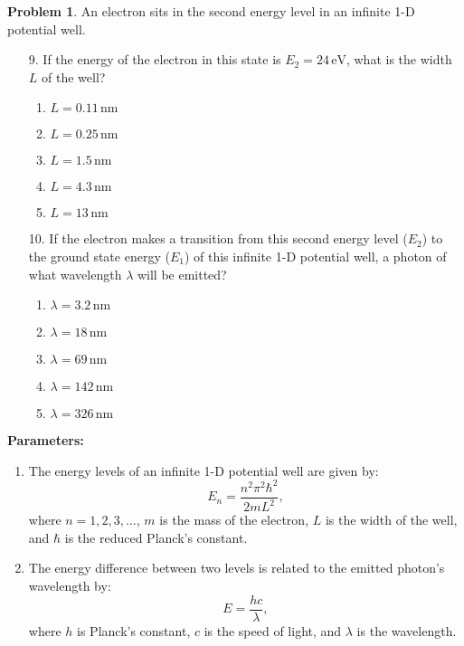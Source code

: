 \documentclass[12pt]{article}
\theoremstyle{definition} %
\newtheorem{problem}{Problem}
\theoremstyle{plain} %
\begin{document}
\begin{problem}
An electron sits in the second energy level in an infinite 1-D potential well.

\begin{enumerate}
    \item[9.] If the energy of the electron in this state is \(E_2 = 24 \, \text{eV}\), what is the width \(L\) of the well?
    \begin{enumerate}
        \item \(L = 0.11 \, \text{nm}\)
        \item \textbf{\(L = 0.25 \, \text{nm}\)}
        \item \(L = 1.5 \, \text{nm}\)
        \item \(L = 4.3 \, \text{nm}\)
        \item \(L = 13 \, \text{nm}\)
    \end{enumerate}
    \item[10.] If the electron makes a transition from this second energy level (\(E_2\)) to the ground state energy (\(E_1\)) of this infinite 1-D potential well, a photon of what wavelength \(\lambda\) will be emitted?
    \begin{enumerate}
        \item \(\lambda = 3.2 \, \text{nm}\)
        \item \(\lambda = 18 \, \text{nm}\)
        \item \textbf{\(\lambda = 69 \, \text{nm}\)}
        \item \(\lambda = 142 \, \text{nm}\)
        \item \(\lambda = 326 \, \text{nm}\)
    \end{enumerate}
\end{enumerate}

\textbf{Parameters:}
\begin{enumerate}
    \item The energy levels of an infinite 1-D potential well are given by:
    $$
    E_n = \frac{n^2 \pi^2 \hbar^2}{2mL^2},
    $$
    where \(n = 1, 2, 3, \dots\), \(m\) is the mass of the electron, \(L\) is the width of the well, and \(\hbar\) is the reduced Planck's constant.
    \item The energy difference between two levels is related to the emitted photon's wavelength by:
    $$
    E = \frac{hc}{\lambda},
    $$
    where \(h\) is Planck's constant, \(c\) is the speed of light, and \(\lambda\) is the wavelength.
\end{enumerate}


\end{problem}
\end{document}
